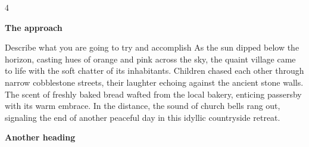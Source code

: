 \documentclass[a0]{4by3}
\newcommand{\NumColumns}{4}
\begin{document}
\begin{minipage}{\linewidth + 2\fboxsep}
\begin{multicols*}{\NumColumns}
            \begin{center}
                \vspace{5mm}
                \vspace{5mm}
            \end{center}
        
        \begin{center}
        \LARGE{\textbf{The approach}}
        \end{center}
            \large
        
            Describe what you are going to try and accomplish
	As the sun dipped below the horizon, casting hues of orange and pink across the sky, the quaint village came to life with the soft chatter of its inhabitants. Children chased each other through narrow cobblestone streets, their laughter echoing against the ancient stone walls. The scent of freshly baked bread wafted from the local bakery, enticing passersby with its warm embrace. In the distance, the sound of church bells rang out, signaling the end of another peaceful day in this idyllic countryside retreat.


            
        
        \begin{center}
        \vspace{2cm}
        \LARGE{\textbf{Another heading}}
        \end{center}
            \large
        

\end{multicols*}
\end{minipage}
\end{document}

